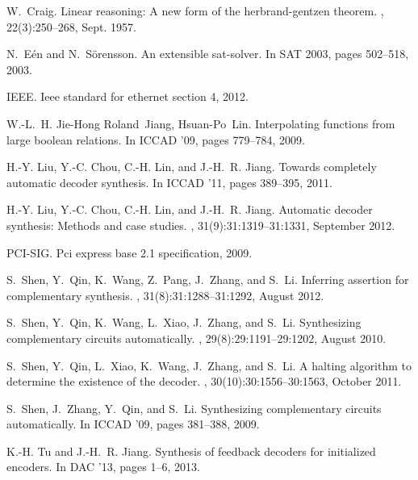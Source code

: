 \documentclass[twocolumn]{article}
\begin{document}
% 
% 

\begin{thebibliography}{12}


W.~Craig.
\newblock Linear reasoning: A new form of the herbrand-gentzen theorem.
, 22(3):250--268, Sept. 1957.

N.~E\'en and N.~S{\"o}rensson.
\newblock An extensible sat-solver.
\newblock In SAT 2003, pages 502--518, 2003.
  
IEEE.
\newblock Ieee standard for ethernet section 4, 2012.

W.-L.~H. Jie-Hong Roland~Jiang, Hsuan-Po~Lin.
\newblock Interpolating functions from large boolean relations.
\newblock In ICCAD '09, pages 779--784, 2009.

H.-Y. Liu, Y.-C. Chou, C.-H. Lin, and J.-H.~R. Jiang.
\newblock Towards completely automatic decoder synthesis.
\newblock In ICCAD '11, pages 389--395, 2011.

H.-Y. Liu, Y.-C. Chou, C.-H. Lin, and J.-H.~R. Jiang.
\newblock Automatic decoder synthesis: Methods and case studies.
, 31(9):31:1319--31:1331, September 2012.


PCI-SIG.
\newblock Pci express base 2.1 specification, 2009.

S.~Shen, Y.~Qin, K.~Wang, Z.~Pang, J.~Zhang, and S.~Li.
\newblock Inferring assertion for complementary synthesis.
, 31(8):31:1288--31:1292, August 2012.

S.~Shen, Y.~Qin, K.~Wang, L.~Xiao, J.~Zhang, and S.~Li.
\newblock Synthesizing complementary circuits automatically.
, 29(8):29:1191--29:1202, August 2010.

S.~Shen, Y.~Qin, L.~Xiao, K.~Wang, J.~Zhang, and S.~Li.
\newblock A halting algorithm to determine the existence of the decoder.
, 30(10):30:1556--30:1563, October 2011.

S.~Shen, J.~Zhang, Y.~Qin, and S.~Li.
\newblock Synthesizing complementary circuits automatically.
\newblock In ICCAD '09, pages 381--388, 2009.

K.-H. Tu and J.-H.~R. Jiang.
\newblock Synthesis of feedback decoders for initialized encoders.
\newblock In DAC '13, pages 1--6, 2013.

\end{thebibliography}
\end{document}
